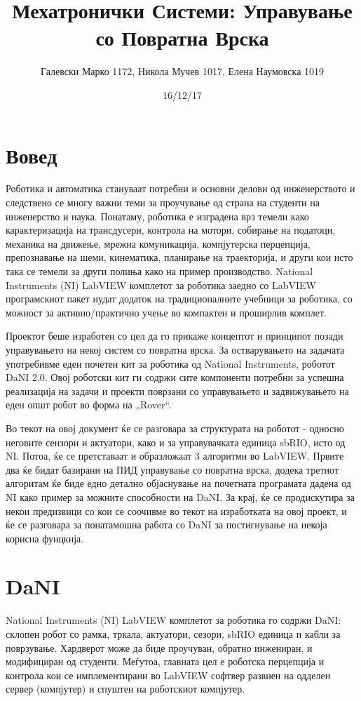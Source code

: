 \documentclass{article}
\title{Мехатронички Системи: Управување со Повратна Врска}
\date{16/12/17}
\author{Галевски Марко 1172, Никола Мучев 1017, Елена Наумовска 1019}
\begin{document}
    \maketitle{}
    \newpage

\section{Вовед}
Роботика и автоматика стануваат потребни и основни делови од инженерството и следствено се многу важни теми за проучување од страна на студенти на инженерство и наука. Понатаму, роботика е изградена врз темели како карактеризација на трансдусери, контрола на мотори, собирање на податоци, механика на движење, мрежна комуникација, компјутерска перцепција, препознавање на шеми, кинематика, планирање на траекторија, и други кои исто така се темели за други полиња како на пример производство. National Instruments (NI) LabVIEW комплетот за роботика заедно со LabVIEW програмскиот пакет нудат додаток на традиционалните учебници за роботика, со можност за активно/практично учење во компактен и проширлив комплет.

Проектот беше изработен со цел да го прикаже концептот и принципот позади управувањето на некој систем со повратна врска. За остварувањето на задачата употребивме еден почетен кит за роботика од National Instruments, роботот DaNI 2.0. Овој роботски кит ги содржи сите компоненти потребни за успешна реализација на задачи и проекти поврзани со управувањето и задвижувањето на еден општ робот во форма на „Rover“. 

Во текот на овој документ ќе се разговара за структурата на роботот - односно неговите сензори и актуатори, како и за управувачката единица sbRIO, исто од NI. Потоа, ќе се претставаат и образложаат 3 алгоритми во LabVIEW. Првите два ќе бидат базирани на ПИД управување со повратна врска, додека третиот алгоритам ќе биде едно детално објаснување на почетната програмата дадена од NI како пример за можните способности на DaNI. За крај, ќе се продискутира за некои предизвици со кои се соочивме во текот на изработката на овој проект, и ќе се разговара за понатамошна работа со DaNI за постигнување на некоја корисна фунцкија.
\section{DaNI}

National Instruments (NI) LabVIEW комплетот за роботика го содржи DaNI: склопен робот со рамка, тркала, актуатори, сезори, sbRIO единица и кабли за поврзување. Хардверот може да биде проучуван, обратно инжениран, и модифициран од студенти. Меѓутоа, главната цел е роботска перцепција и контрола кои се имплементирани во LabVIEW софтвер развиен на одделен сервер (компјутер) и спуштен на роботскиот компјутер.
\end{document}
